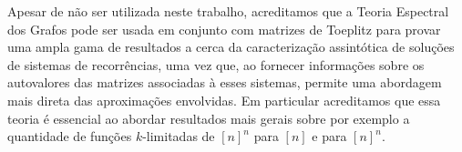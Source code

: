 \documentclass[a4paper,12pt]{article}
\theoremstyle{definition}
\begin{document}
Apesar de não ser utilizada neste trabalho, acreditamos que a Teoria Espectral dos Grafos pode ser usada em conjunto com matrizes de Toeplitz para provar uma ampla gama de resultados a cerca da caracterização assintótica de soluções de sistemas de recorrências, uma vez que, ao fornecer informações sobre os autovalores das matrizes associadas à esses sistemas, permite uma abordagem mais direta das aproximações envolvidas. Em particular acreditamos que essa teoria é essencial ao abordar resultados mais gerais sobre por exemplo a quantidade de funções $k$-limitadas de $[n]^n$ para $[n]$ e para $[n]^n$.

\newpage
\normalsize

\end{document}
